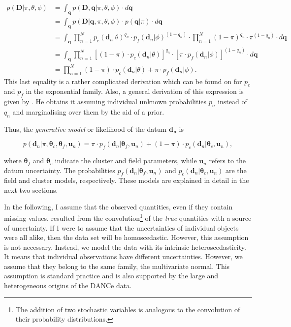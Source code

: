 \begin{align}
p(\mathbf{D}|\pi,\theta,\phi)&=\int_{\mathbf{q}} p(\mathbf{D},\mathbf{q}|\pi,\theta,\phi)\cdot d\mathbf{q} \nonumber \\
&=\int_{\mathbf{q}} p(\mathbf{D}|\mathbf{q},\pi,\theta,\phi)\cdot p(\mathbf{q}|\pi)\cdot d\mathbf{q} \nonumber \\
&=\int_{\mathbf{q}} \prod_{n=1}^N {p_c(\mathbf{d}_n|\theta)}^{q_n}\cdot {p_f(\mathbf{d}_n|\phi)}^{(1-q_n)}\cdot \prod_{n=1}^N {(1-\pi)}^{q_n}\cdot {\pi}^{(1-q_n)}\cdot d\mathbf{q} \nonumber \\
&=\int_{\mathbf{q}} \prod_{n=1}^N \left[(1-\pi)\cdot p_c(\mathbf{d}_n|\theta)\right]^{q_n}\cdot \left[\pi\cdot p_f(\mathbf{d}_n|\phi)\right]^{(1-q_n)}\cdot d\mathbf{q} \nonumber \\
&=\prod_{n=1}^N (1-\pi)\cdot p_c(\mathbf{d}_n|\theta) + \pi\cdot p_f(\mathbf{d}_n|\phi).
\end{align}
This last equality is a rather complicated derivation which can be found on \citet{Press1997,Hogg2010a} for $p_c$ and $p_f$ in the exponential family. Also, a general derivation of this expression is given by \citet{Jaynes2003}. He obtains it assuming individual unknown probabilities $p_n$ instead of $q_n$ and marginalising over them by the aid of a prior.

Thus, the \emph{generative model} or likelihood of the datum $\mathbf{d_n}$  is

\begin{equation}
\label{eq:genmod}
p(\mathbf{d}_n | \pi,\boldsymbol{\theta}_c,\boldsymbol{\theta}_f,\mathbf{u}_n)=\pi \cdot p_f(\mathbf{d}_n|\boldsymbol{\theta}_f,\mathbf{u}_n) + (1-\pi)\cdot p_c(\mathbf{d}_n| \boldsymbol{\theta}_c,\mathbf{u}_n),
\end{equation}

where $\boldsymbol{\theta}_f$ and $\boldsymbol{\theta}_c$ indicate the cluster and field parameters, while $\mathbf{u}_n$ refers to the datum uncertainty. The probabilities $p_f(\mathbf{d}_n|\boldsymbol{\theta}_f,\mathbf{u}_n)$ and $p_c(\mathbf{d}_n| \boldsymbol{\theta}_c,\mathbf{u}_n)$ are the field and cluster models, respectively. These models are explained in detail in the next two sections.

In the following, I assume that the observed quantities, even if they contain missing values, resulted from the convolution\footnote{The addition of two stochastic variables is analogous to the convolution of their probability distributions.} of the \emph{true} quantities with a source of uncertainty. If I were to assume that the uncertainties of individual objects were all alike, then the data set will be homoscedastic. However, this assumption is not necessary. Instead, we model the data with its intrinsic heteroscedasticity. It means that individual observations have different uncertainties. However, we assume that they belong to the same family, the multivariate normal. This assumption is standard practice and is also supported by the large and heterogeneous origins of the DANCe data. 

